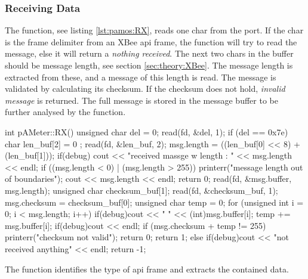 \subsubsection{Receiving Data}
The  function, see listing \ref{lst:pamos:RX}, reads one char from the port. If the char is the frame delimiter from an XBee \ac{api} frame, the function will try to read the message, else it will return a \textit{nothing received}. 
The next two chars in the buffer should be message length, see section \ref{sec:theory:XBee}. The message length is extracted from these, and a message of this length is read. The message is validated by calculating its checksum. If the checksum does not hold, \textit{invalid message} is returned. The full message is stored in the message buffer to be further analysed by the  function.
\begin{codecpp}[caption={\ac{cpp} function, that reads data from the USB port\label{lst:pamos:RX}.}]
int pAMeter::RX()
{
	unsigned char del = 0;
	read(fd, &del, 1);
	if (del == 0x7e) {
		char len_buf[2] = { 0 };
		read(fd, &len_buf, 2);
		msg.length = ((len_buf[0] << 8) + (len_buf[1]));
		if(debug) cout << "received massge w length : " << msg.length << endl;
		if ((msg.length < 0) | (msg.length > 255)) {
			printerr("message length out of boundaries");
			cout << msg.length << endl;
			return 0;
		}
		read(fd, &msg.buffer, msg.length);
		unsigned char checksum_buf[1];
		read(fd, &checksum_buf, 1);
		msg.checksum = checksum_buf[0];
		unsigned char temp = 0;
		for (unsigned int i = 0; i < msg.length; i++) {
			if(debug)cout << " " << (int)msg.buffer[i];
			temp += msg.buffer[i];
		}
		if(debug)cout << endl;
		if (msg.checksum + temp != 255) {
			printerr("checksum not valid");
			return 0;
		}
		return 1;
	} else {
		if(debug)cout << "not received anything" << endl;
		return -1;
	}
}
\end{codecpp}
The  function identifies the type of \ac{api} frame and extracts the contained data.


